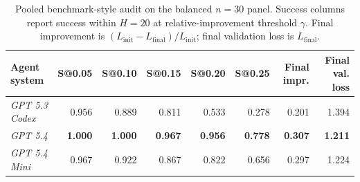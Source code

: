 \documentclass{article}
\begin{document}
\begin{table}[t]
\centering
\footnotesize
\setlength{\tabcolsep}{3.2pt}
\caption{Pooled benchmark-style audit on the balanced \(n=30\) panel.
Success columns report success within \(H=20\) at relative-improvement threshold \(\gamma\).
Final improvement is \((L_{\mathrm{init}}-L_{\mathrm{final}})/L_{\mathrm{init}}\); final validation loss is \(L_{\mathrm{final}}\).}
\label{tab:pooled-benchmark-audit}
\begin{tabular}{@{}lrrrrrrr@{}}
\toprule
Agent system & S@0.05 & S@0.10 & S@0.15 & S@0.20 & S@0.25 & Final impr. & Final val. loss \\
\midrule
\textit{GPT 5.3 Codex} & 0.956 & 0.889 & 0.811 & 0.533 & 0.278 & 0.201 & 1.394 \\
\textit{GPT 5.4} & \textbf{1.000} & \textbf{1.000} & \textbf{0.967} & \textbf{0.956} & \textbf{0.778} & \textbf{0.307} & \textbf{1.211} \\
\textit{GPT 5.4 Mini} & 0.967 & 0.922 & 0.867 & 0.822 & 0.656 & 0.297 & 1.224 \\
\bottomrule
\end{tabular}
\end{table}
\end{document}
